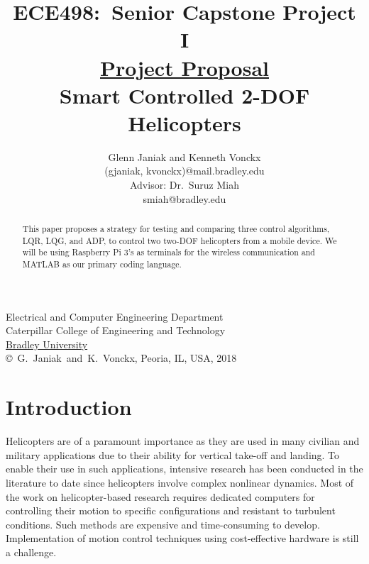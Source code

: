 \documentclass[letterpaper, 10pt, conference]{ieeeconf}
\title{ECE498:~Senior Capstone Project I\\\textbf{\underline{Project Proposal}}\\
\vspace{0.5in}
Smart Controlled 2-DOF Helicopters}
\author{Glenn Janiak and Kenneth Vonckx\\ (gjaniak, kvonckx)@mail.bradley.edu\\ Advisor: Dr.~Suruz Miah\\ smiah@bradley.edu
}
\date{}  %
\begin{document}
\begin{titlepage}
 \maketitle

\vspace*{4.0cm}
\begin{center}
\normalsize
Electrical and Computer Engineering Department\\
Caterpillar College of Engineering and Technology\\
\href{http://www.bradley.edu/}{Bradley University}\\

\vspace*{6.0cm}
\copyright~G.~Janiak~and~K.~Vonckx, Peoria, IL, USA, 2018\\

\end{center}
\thispagestyle{empty}

\end{titlepage} 

\begin{abstract} %
    This paper proposes a strategy for testing and comparing three control algorithms, LQR, LQG, and ADP, to control two two-DOF helicopters from a mobile device.  We will be using Raspberry Pi 3's as terminals for the wireless communication and MATLAB as our primary coding language.
\end{abstract}

\section{Introduction} %

Helicopters are of a paramount importance as they are used in many civilian and military applications due to their ability for vertical take-off and landing.  To enable their use in such applications, intensive research has been conducted in the literature to date since helicopters involve complex nonlinear dynamics.  Most of the work on helicopter-based research requires dedicated computers for controlling their motion to specific configurations and resistant to turbulent conditions.  Such methods are expensive and time-consuming to develop.  Implementation of motion control techniques using cost-effective hardware is still a challenge.
\end{document}
